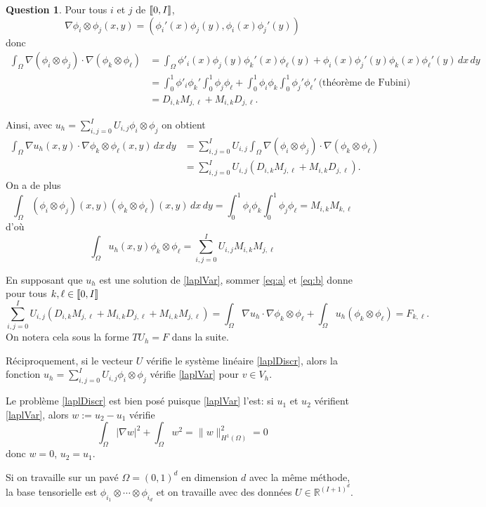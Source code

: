 \documentclass[11pt]{article}
\newcommand{\RR}{\mathbb{R}}
\DeclarePairedDelimiter{\zintcc}{[\![}{]\!]}
\theoremstyle{definition}
\newtheorem{ques}{Question}
\begin{document}
\begin{ques}
Pour tous $i$ et $j$ de $\zintcc{0,I}$,
\[
\nabla \phi_i\otimes\phi_j (x,y) = \left(
\phi_i'(x)\phi_j(y), \phi_i(x)\phi_j'(y)
\right)
\]
donc 
\begin{align*}
\int_{\Omega}\nabla(\phi_i\otimes\phi_j)\cdot\nabla(\phi_k\otimes\phi_\ell) 
&=
\int_{\Omega} \phi'_i(x)\phi_j(y)\phi_k'(x)\phi_\ell(y) + \phi_i(x)\phi_j'(y)\phi_k(x)\phi_\ell'(y)\,dx\,dy \\
&= \int_{0}^{1}\phi'_i\phi_k' \int_0^1\phi_j\phi_\ell + \int_{0}^{1}\phi_i\phi_k \int_0^1\phi_j'\phi_\ell' \ \text{(théorème de Fubini)} \\
&= D_{i,k}M_{j,\ell} + M_{i,k}D_{j,\ell}.
\end{align*}

Ainsi, avec $u_h = \sum_{i,j=0}^{I}U_{i,j}\phi_i\otimes\phi_j$ on obtient
\begin{align*}\tag{a}\label{eq:a}
\int_{\Omega} \nabla u_h(x,y)\cdot \nabla \phi_k\otimes\phi_\ell (x,y)\,dx\,dy 
&= \sum_{i,j=0}^{I}U_{i,j} \int_\Omega\nabla(\phi_i\otimes\phi_j)\cdot\nabla(\phi_k\otimes\phi_\ell) \\
&= \sum_{i,j=0}^{I}U_{i,j} (D_{i,k}M_{j,\ell}+M_{i,k}D_{j,\ell}).
\end{align*}
On a de plus
\[
\int_\Omega (\phi_i\otimes\phi_j)(x,y)(\phi_k\otimes\phi_\ell)(x,y)\,dx\,dy = \int_0^1 \phi_i \phi_k \int_0^1 \phi_j \phi_\ell = M_{i,k}M_{k,\ell}
\]
d'où
\begin{equation}\tag{b}\label{eq:b}
\int_\Omega u_h(x,y)\phi_k\otimes\phi_\ell = \sum_{i,j=0}^{I}U_{i,j}M_{i,k}M_{j,\ell}
\end{equation}

En supposant que $u_h$ est une solution de \eqref{laplVar}, sommer \eqref{eq:a} et \eqref{eq:b} donne pour tous $k,\ell\in\zintcc{0,I}$
\begin{equation}\label{laplDiscr}
\sum_{i,j=0}^{I}U_{i,j}(D_{i,k}M_{j,\ell} + M_{i,k}D_{j,\ell} + M_{i,k}M_{j,\ell}) =
\int_\Omega\nabla u_h\cdot \nabla\phi_k\otimes\phi_\ell + \int_\Omega u_h (\phi_k\otimes\phi_\ell)
= F_{k,\ell}.
\end{equation}
On notera cela sous la forme $TU_h = F$ dans la suite.

Réciproquement, si le vecteur $U$ vérifie le système linéaire \eqref{laplDiscr}, alors la fonction $u_h = \sum_{i,j=0}^{I}U_{i,j}\phi_i\otimes\phi_j$ vérifie \eqref{laplVar} pour $v\in V_h$.

Le problème \eqref{laplDiscr} est bien posé puisque \eqref{laplVar} l'est: si $u_1$ et $u_2$ vérifient \eqref{laplVar}, alors $w:= u_2-u_1$ vérifie
\[
\int_\Omega \left|\nabla w\right|^2 + \int_\Omega w^2 = \|w\|_{H^1(\Omega)}^2 = 0
\]
donc $w = 0$, $u_2 = u_1$.

Si on travaille sur un pavé $\Omega = (0,1)^d$ en dimension $d$ avec la même méthode, la base tensorielle est $\phi_{i_1}\otimes\cdots\otimes\phi_{i_d}$ et on travaille avec des données $U \in \RR^{(I+1)^d}$.

\end{ques}
\end{document}
